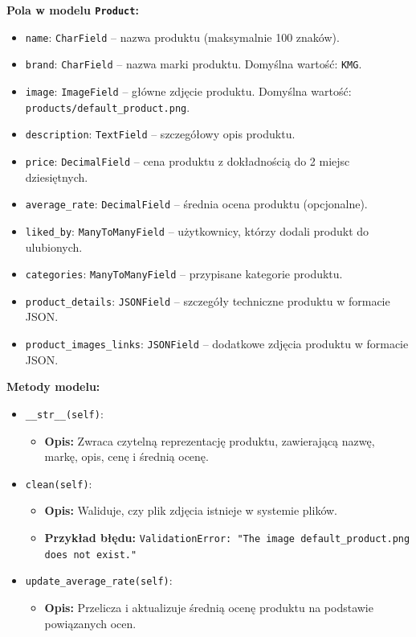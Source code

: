 \documentclass[12pt,a4paper,oneside]{article}
\theoremstyle{definition}
\numberwithin{equation}{section}
\begin{document}
\textbf{Pola w modelu \texttt{Product}:}
\begin{itemize}
    \item \texttt{name}: \texttt{CharField} – nazwa produktu (maksymalnie 100 znaków).
    \item \texttt{brand}: \texttt{CharField} – nazwa marki produktu. Domyślna wartość: \texttt{KMG}.
    \item \texttt{image}: \texttt{ImageField} – główne zdjęcie produktu. Domyślna wartość: \texttt{products/default\_product.png}.
    \item \texttt{description}: \texttt{TextField} – szczegółowy opis produktu.
    \item \texttt{price}: \texttt{DecimalField} – cena produktu z dokładnością do 2 miejsc dziesiętnych.
    \item \texttt{average\_rate}: \texttt{DecimalField} – średnia ocena produktu (opcjonalne).
    \item \texttt{liked\_by}: \texttt{ManyToManyField} – użytkownicy, którzy dodali produkt do ulubionych.
    \item \texttt{categories}: \texttt{ManyToManyField} – przypisane kategorie produktu.
    \item \texttt{product\_details}: \texttt{JSONField} – szczegóły techniczne produktu w formacie JSON.
    \item \texttt{product\_images\_links}: \texttt{JSONField} – dodatkowe zdjęcia produktu w formacie JSON.
\end{itemize}

\textbf{Metody modelu:}
\begin{itemize}
    \item \texttt{\_\_str\_\_(self)}:
    \begin{itemize}
        \item \textbf{Opis:} Zwraca czytelną reprezentację produktu, zawierającą nazwę, markę, opis, cenę i średnią ocenę.
    \end{itemize}
    \item \texttt{clean(self)}:
    \begin{itemize}
        \item \textbf{Opis:} Waliduje, czy plik zdjęcia istnieje w systemie plików.
        \item \textbf{Przykład błędu:} \texttt{ValidationError: "The image default\_product.png does not exist."}
    \end{itemize}
    \item \texttt{update\_average\_rate(self)}:
    \begin{itemize}
        \item \textbf{Opis:} Przelicza i aktualizuje średnią ocenę produktu na podstawie powiązanych ocen.
    \end{itemize}
\end{itemize}
\end{document}
